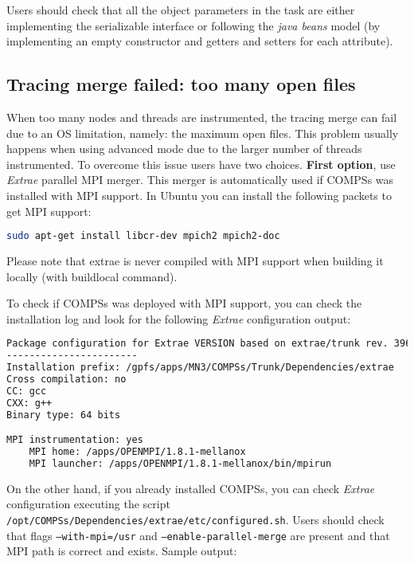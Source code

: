 Users should check that all the object parameters in the task are either implementing the serializable interface or following 
the \textit{java beans} model (by implementing an empty constructor and getters and setters for each attribute).


%
%
\subsection{Tracing merge failed: too many open files}

When too many nodes and threads are instrumented, the tracing merge can fail due to an OS limitation, namely: the maximum open files. This
problem usually happens when using advanced mode due to the larger number of threads instrumented. To overcome this issue users have two
choices. \textbf{First option}, use \textit{Extrae} parallel MPI merger. This merger is automatically used if COMPSs was installed with MPI
support. In Ubuntu you can install the following packets to get MPI support:

\begin{lstlisting}[language=bash]
sudo apt-get install libcr-dev mpich2 mpich2-doc
\end{lstlisting}

Please note that extrae is never compiled with MPI support when building it locally (with buildlocal command).

To check if COMPSs was deployed with MPI support, you can check the installation log and look for the following \textit{Extrae} configuration output:

\begin{lstlisting}[language=bash]
Package configuration for Extrae VERSION based on extrae/trunk rev. 3966:
-----------------------
Installation prefix: /gpfs/apps/MN3/COMPSs/Trunk/Dependencies/extrae
Cross compilation: no
CC: gcc
CXX: g++
Binary type: 64 bits

MPI instrumentation: yes
	MPI home: /apps/OPENMPI/1.8.1-mellanox
	MPI launcher: /apps/OPENMPI/1.8.1-mellanox/bin/mpirun
\end{lstlisting}

On the other hand, if you already installed COMPSs, you can check \textit{Extrae} configuration executing the script
\texttt{/opt/COMPSs/Dependencies/extrae/etc/configured.sh}. Users should check that flags \texttt{--with-mpi=/usr} and
\texttt{--enable-parallel-merge} are present and that MPI path is correct and exists. Sample output:

